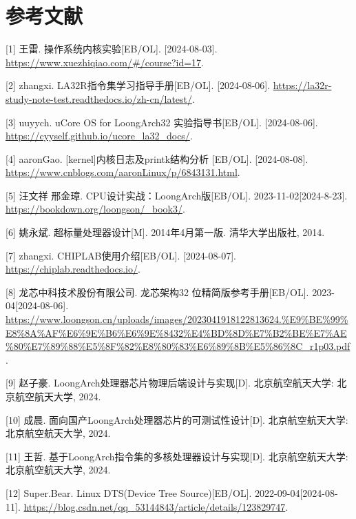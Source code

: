 
\chapter*{参考文献}\label{chap:20-references}


{[}1{]} 王雷. 操作系统内核实验{[}EB/OL{]}. {[}2024-08-03{]}. \url{https://www.xuezhiqiao.com/\#/course?id=17}.

{[}2{]} zhangxi. LA32R指令集学习指导手册{[}EB/OL{]}. {[}2024-08-06{]}. \url{https://la32r-study-note-test.readthedocs.io/zh-cn/latest/}.

{[}3{]} uuyych. uCore OS for LoongArch32 实验指导书{[}EB/OL{]}. {[}2024-08-06{]}. \url{https://cyyself.github.io/ucore_la32_docs/}.

{[}4{]} aaronGao. {[}kernel{]}内核日志及printk结构分析 {[}EB/OL{]}. {[}2024-08-08{]}. \url{https://www.cnblogs.com/aaronLinux/p/6843131.html}.

{[}5{]} 汪文祥 邢金璋. CPU设计实战：LoongArch版{[}EB/OL{]}. 2023-11-02{[}2024-8-23{]}. \url{https://bookdown.org/loongson/_book3/}.

{[}6{]} 姚永斌. 超标量处理器设计{[}M{]}. 2014年4月第一版. 清华大学出版社, 2014.

{[}7{]} zhangxi. CHIPLAB使用介绍{[}EB/OL{]}. {[}2024-08-07{]}. \url{https://chiplab.readthedocs.io/}.

{[}8{]} 龙芯中科技术股份有限公司. 龙芯架构32 位精简版参考手册{[}EB/OL{]}. 2023-04{[}2024-08-06{]}. \url{https://www.loongson.cn/uploads/images/2023041918122813624.\%E9\%BE\%99\%E8\%8A\%AF\%E6\%9E\%B6\%E6\%9E\%8432\%E4\%BD\%8D\%E7\%B2\%BE\%E7\%AE\%80\%E7\%89\%88\%E5\%8F\%82\%E8\%80\%83\%E6\%89\%8B\%E5\%86\%8C_r1p03.pdf}.

{[}9{]} 赵子豪. LoongArch处理器芯片物理后端设计与实现{[}D{]}. 北京航空航天大学: 北京航空航天大学, 2024.

{[}10{]} 成晨. 面向国产LoongArch处理器芯片的可测试性设计{[}D{]}. 北京航空航天大学: 北京航空航天大学, 2024.

{[}11{]} 王哲. 基于LoongArch指令集的多核处理器设计与实现{[}D{]}. 北京航空航天大学: 北京航空航天大学, 2024.

{[}12{]} Super.Bear. Linux DTS(Device Tree Source){[}EB/OL{]}. 2022-09-04{[}2024-08-11{]}. \url{https://blog.csdn.net/qq_53144843/article/details/123829747}.
